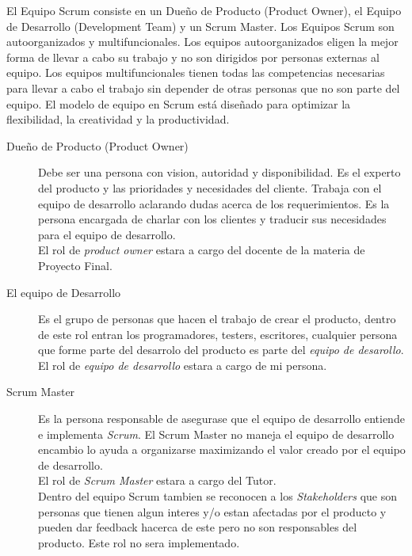      El Equipo Scrum consiste en un Dueño de Producto (Product Owner), el Equipo de Desarrollo       (Development Team) y un Scrum Master. Los Equipos Scrum son autoorganizados y      multifuncionales. Los equipos autoorganizados eligen la mejor forma de llevar a cabo su trabajo y no son dirigidos por personas externas al equipo. Los equipos multifuncionales tienen todas las competencias necesarias para llevar a cabo el trabajo sin depender de otras personas que no son parte del equipo. El modelo de equipo en Scrum está diseñado para optimizar la flexibilidad, la creatividad y la productividad.

      \begin{description}
        \item[Due\~no de Producto (Product Owner)] Debe ser una persona con vision, autoridad y disponibilidad. Es el experto del producto y las prioridades y necesidades del cliente. Trabaja con el equipo de desarrollo aclarando dudas acerca de los requerimientos. Es la persona encargada de charlar con los clientes y traducir sus necesidades para el equipo de desarrollo.\\
        El rol de \emph{product owner} estara a cargo del docente de la materia de Proyecto Final.

        \item[El equipo de Desarrollo] Es el grupo de personas que hacen el trabajo de crear el producto, dentro de este rol entran los programadores, testers, escritores, cualquier persona que forme parte del desarrolo del producto es parte del \emph{equipo de desarollo}.\\
        El rol de \emph{equipo de desarrollo} estara a cargo de mi persona.

        \item[Scrum Master] Es la persona responsable de asegurase que el equipo de desarrollo entiende e implementa \emph{Scrum}. El Scrum Master no maneja el equipo de desarrollo encambio lo ayuda a organizarse maximizando el valor creado por el equipo de desarrollo.\\
        El rol de \emph{Scrum Master} estara a cargo del Tutor.\\

        Dentro del equipo Scrum tambien se reconocen a los \emph{Stakeholders} que son personas que tienen algun interes y/o estan afectadas por el producto y pueden dar feedback hacerca de este pero no son responsables del producto. Este rol no sera implementado.

      \end{description}

